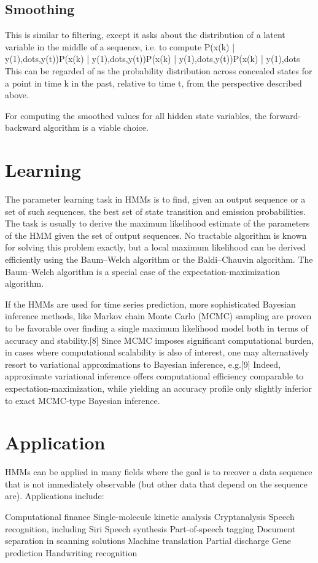\documentclass[10pt,a4paper,twoside]{article}
\begin{document}
\subsection{   Smoothing}

This is similar to filtering, except it asks about the distribution of a latent variable in the middle of a sequence, i.e. to compute P(x(k) | y(1),dots,y(t))P(x(k) | y(1),dots,y(t))P(x(k) | y(1),dots,y(t))P(x(k) | y(1),dots This can be regarded of as the probability distribution across concealed states for a point in time k in the past, relative to time t, from the perspective described above.

For computing the smoothed values for all hidden state variables, the forward-backward algorithm is a viable choice.
 \section{ Learning  }
The parameter learning task in HMMs is to find, given an output sequence or a set of such sequences, the best set of state transition and emission probabilities. The task is usually to derive the maximum likelihood estimate of the parameters of the HMM given the set of output sequences. No tractable algorithm is known for solving this problem exactly, but a local maximum likelihood can be derived efficiently using the Baum–Welch algorithm or the Baldi–Chauvin algorithm. The Baum–Welch algorithm is a special case of the expectation-maximization algorithm.

If the HMMs are used for time series prediction, more sophisticated Bayesian inference methods, like Markov chain Monte Carlo (MCMC) sampling are proven to be favorable over finding a single maximum likelihood model both in terms of accuracy and stability.[8] Since MCMC imposes significant computational burden, in cases where computational scalability is also of interest, one may alternatively resort to variational approximations to Bayesian inference, e.g.[9] Indeed, approximate variational inference offers computational efficiency comparable to expectation-maximization, while yielding an accuracy profile only slightly inferior to exact MCMC-type Bayesian inference.

\section{Application  }
HMMs can be applied in many fields where the goal is to recover a data sequence that is not immediately observable (but other data that depend on the sequence are). Applications include:

Computational finance
Single-molecule kinetic analysis
Cryptanalysis
Speech recognition, including Siri
Speech synthesis
Part-of-speech tagging
Document separation in scanning solutions
Machine translation
Partial discharge
Gene prediction
Handwriting recognition





 
\end{document}
